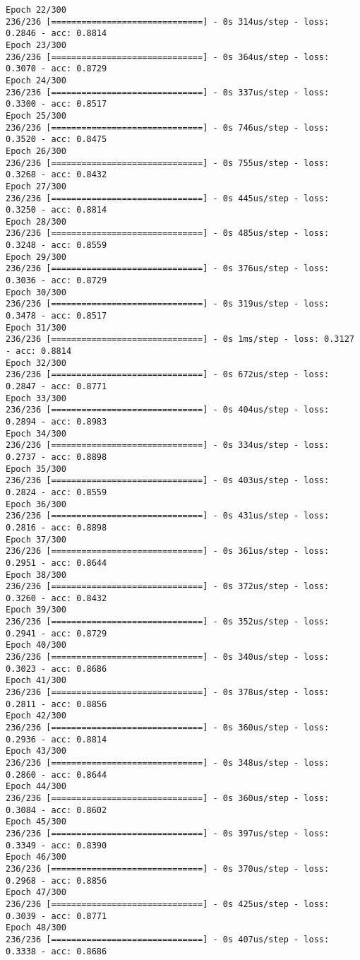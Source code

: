 \documentclass[11pt]{article}
\begin{document}
\begin{Verbatim}[commandchars=\\\{\}]
Epoch 22/300
236/236 [==============================] - 0s 314us/step - loss: 0.2846 - acc: 0.8814
Epoch 23/300
236/236 [==============================] - 0s 364us/step - loss: 0.3070 - acc: 0.8729
Epoch 24/300
236/236 [==============================] - 0s 337us/step - loss: 0.3300 - acc: 0.8517
Epoch 25/300
236/236 [==============================] - 0s 746us/step - loss: 0.3520 - acc: 0.8475
Epoch 26/300
236/236 [==============================] - 0s 755us/step - loss: 0.3268 - acc: 0.8432
Epoch 27/300
236/236 [==============================] - 0s 445us/step - loss: 0.3250 - acc: 0.8814
Epoch 28/300
236/236 [==============================] - 0s 485us/step - loss: 0.3248 - acc: 0.8559
Epoch 29/300
236/236 [==============================] - 0s 376us/step - loss: 0.3036 - acc: 0.8729
Epoch 30/300
236/236 [==============================] - 0s 319us/step - loss: 0.3478 - acc: 0.8517
Epoch 31/300
236/236 [==============================] - 0s 1ms/step - loss: 0.3127 - acc: 0.8814
Epoch 32/300
236/236 [==============================] - 0s 672us/step - loss: 0.2847 - acc: 0.8771
Epoch 33/300
236/236 [==============================] - 0s 404us/step - loss: 0.2894 - acc: 0.8983
Epoch 34/300
236/236 [==============================] - 0s 334us/step - loss: 0.2737 - acc: 0.8898
Epoch 35/300
236/236 [==============================] - 0s 403us/step - loss: 0.2824 - acc: 0.8559
Epoch 36/300
236/236 [==============================] - 0s 431us/step - loss: 0.2816 - acc: 0.8898
Epoch 37/300
236/236 [==============================] - 0s 361us/step - loss: 0.2951 - acc: 0.8644
Epoch 38/300
236/236 [==============================] - 0s 372us/step - loss: 0.3260 - acc: 0.8432
Epoch 39/300
236/236 [==============================] - 0s 352us/step - loss: 0.2941 - acc: 0.8729
Epoch 40/300
236/236 [==============================] - 0s 340us/step - loss: 0.3023 - acc: 0.8686
Epoch 41/300
236/236 [==============================] - 0s 378us/step - loss: 0.2811 - acc: 0.8856
Epoch 42/300
236/236 [==============================] - 0s 360us/step - loss: 0.2936 - acc: 0.8814
Epoch 43/300
236/236 [==============================] - 0s 348us/step - loss: 0.2860 - acc: 0.8644
Epoch 44/300
236/236 [==============================] - 0s 360us/step - loss: 0.3084 - acc: 0.8602
Epoch 45/300
236/236 [==============================] - 0s 397us/step - loss: 0.3349 - acc: 0.8390
Epoch 46/300
236/236 [==============================] - 0s 370us/step - loss: 0.2968 - acc: 0.8856
Epoch 47/300
236/236 [==============================] - 0s 425us/step - loss: 0.3039 - acc: 0.8771
Epoch 48/300
236/236 [==============================] - 0s 407us/step - loss: 0.3338 - acc: 0.8686

\end{Verbatim}
\end{document}
